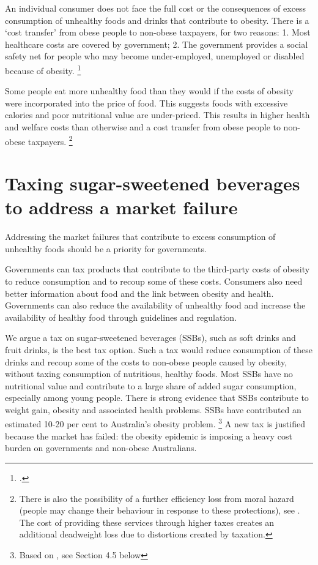 \documentclass[embargoed]{grattan}
\begin{document}
An individual consumer does not face the full cost or the consequences of excess consumption of unhealthy foods and drinks that contribute to obesity.
There is a `cost transfer' from obese people to non-obese taxpayers, for two reasons: 1.
Most healthcare costs are covered by government; 2.
The government provides a social safety net for people who may become under-employed, unemployed or disabled because of obesity.%
\footcites{Karnani2016ObesityCrisisas}{Freebairn2010Taxationobesity}{Koplan2010Responsefoodbeverage}{Brownell2009Ouncespreventionthepublic}{Commission2010ChildhoodObesityEconomic}

Some people eat more unhealthy food than they would if the costs of obesity were incorporated into the price of food.
This suggests foods with excessive calories and poor nutritional value are under-priced.
This results in higher health and welfare costs than otherwise and a cost transfer from obese people to non-obese taxpayers.%
\footnote{There is also the possibility of a further efficiency loss from moral hazard (people may change their behaviour in response to these protections), see \textcite{Bhattacharya2011Whopaysobesity}.
The cost of providing these services through higher taxes creates an additional deadweight loss due to distortions created by taxation.}

\chapter{Taxing sugar-sweetened beverages to address a market failure}\label{taxing-sugar-sweetened-beverages-to-address-a-market-failure}

Addressing the market failures that contribute to excess consumption of unhealthy foods should be a priority for governments.

Governments can tax products that contribute to the third-party costs of obesity to reduce consumption and to recoup some of these costs.
Consumers also need better information about food and the link between obesity and health.
Governments can also reduce the availability of unhealthy food and increase the availability of healthy food through guidelines and regulation.

We argue a tax on sugar-sweetened beverages (SSBs), such as soft drinks and fruit drinks, is the best tax option.
Such a tax would reduce consumption of these drinks and recoup some of the costs to non-obese people caused by obesity, without taxing consumption of nutritious, healthy foods.
Most SSBs have no nutritional value and contribute to a large share of added sugar consumption, especially among young people.
There is strong evidence that SSBs contribute to weight gain, obesity and associated health problems.
SSBs have contributed an estimated 10-20 per cent to Australia's obesity problem.%
\footnote{Based on \textcite{Woodward-Lopez2010whatextenthave}, see Section 4.5 below} A new tax is justified because the market has failed: the obesity epidemic is imposing a heavy cost burden on governments and non-obese Australians.
\end{document}
